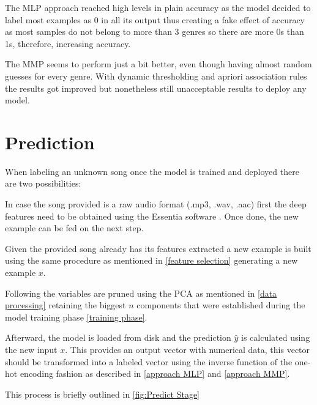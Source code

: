 The MLP approach reached high levels in plain accuracy as the model decided to label most examples as 0 in all its output thus creating a fake effect of accuracy as most samples do not belong to more than 3 genres so there are more 0s than 1s, therefore, increasing accuracy. 

The MMP seems to perform just a bit better, even though having almost random guesses for every genre. With dynamic thresholding
and apriori association rules the results got improved but nonetheless still unacceptable results to deploy any model.


\section{Prediction}

When labeling an unknown song once the model is trained and deployed there are two possibilities:

In case the song provided is a raw audio format (.mp3, .wav, .aac) first the deep features need to be obtained using the Essentia software \cite{essentia}. Once done, the new example can be fed on the next step.

Given the provided song already has its features extracted a new example is built using the same procedure as mentioned in \ref{feature selection} generating a new example $x$.

Following the variables are pruned using the PCA as mentioned in \ref{data processing} retaining the biggest $n$ components that were established during the model training phase \ref{training phase}.

Afterward, the model is loaded from disk and the prediction $\hat{y}$ is calculated using the new input $x$. 
This provides an output vector with numerical data, this vector should be transformed into a labeled vector using the inverse function of the one-hot encoding fashion as described in \ref{approach MLP} and \ref{approach MMP}.

This process is briefly outlined in \ref{fig:Predict Stage}


